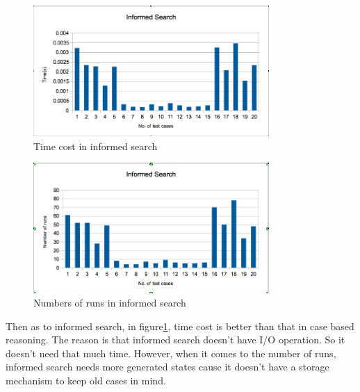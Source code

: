 \documentclass[12pt]{article}
\begin{document}
\begin{enumerate}
\begin{figure}[H]
\centering
\includegraphics[width=0.8\textwidth]{Time_informed.png}
\caption{Time cost in informed search}
\label{fig:Time_info}
\end{figure}
\begin{figure}[H]
\centering
\includegraphics[width=0.8\textwidth]{Number_informed.png}
\caption{Numbers of runs in informed search}
\label{fig:Num_info}
\end{figure}
Then as to informed search, in figure\ref{fig:Time_info}, time cost is better than that in case based reasoning. The reason is that informed search doesn't have I/O operation. So it doesn't need that much time. However, when it comes to the number of runs, informed search needs more generated states cause it doesn't have a storage mechanism to keep old cases in mind. 


\end{enumerate}
\end{document}
